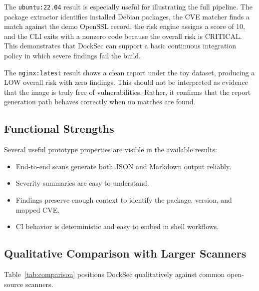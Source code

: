 \documentclass[12pt,draftclsnofoot,onecolumn]{IEEEtran}
\begin{document}
The \texttt{ubuntu:22.04} result is especially useful for illustrating the full pipeline. The package extractor identifies installed Debian packages, the CVE matcher finds a match against the demo OpenSSL record, the risk engine assigns a score of 10, and the CLI exits with a nonzero code because the overall risk is CRITICAL. This demonstrates that DockSec can support a basic continuous integration policy in which severe findings fail the build.

The \texttt{nginx:latest} result shows a clean report under the toy dataset, producing a LOW overall risk with zero findings. This should not be interpreted as evidence that the image is truly free of vulnerabilities. Rather, it confirms that the report generation path behaves correctly when no matches are found.

\subsection{Functional Strengths}
Several useful prototype properties are visible in the available results:
\begin{itemize}
  \item End-to-end scans generate both JSON and Markdown output reliably.
  \item Severity summaries are easy to understand.
  \item Findings preserve enough context to identify the package, version, and mapped CVE.
  \item CI behavior is deterministic and easy to embed in shell workflows.
\end{itemize}

\subsection{Qualitative Comparison with Larger Scanners}
Table~\ref{tab:comparison} positions DockSec qualitatively against common open-source scanners.
\end{document}
